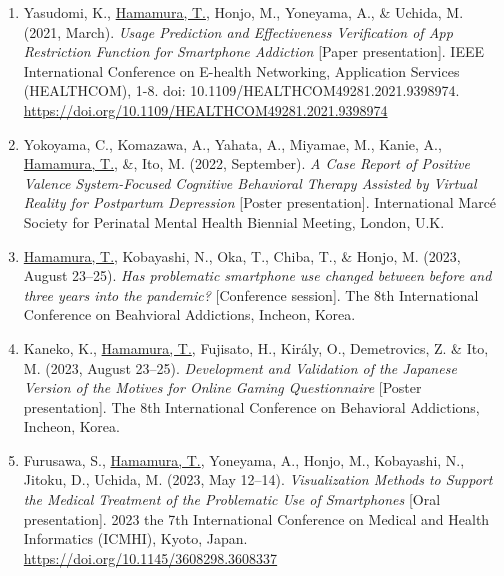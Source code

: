 \documentclass[11pt,a4paper]{article}
\begin{document}
\begin{enumerate}
	\item Yasudomi, K., \underline{Hamamura, T.}, Honjo, M., Yoneyama, A., \& Uchida, M. (2021, March). \textit{Usage Prediction and Effectiveness Verification of App Restriction Function for Smartphone Addiction} [Paper presentation]. IEEE International Conference on E-health Networking, Application Services (HEALTHCOM), 1-8. doi: 10.1109/HEALTHCOM49281.2021.9398974.  \url{https://doi.org/10.1109/HEALTHCOM49281.2021.9398974}
	\item Yokoyama, C., Komazawa, A., Yahata, A., Miyamae, M., Kanie, A., \underline{Hamamura, T.}, \&, Ito, M. (2022, September). \textit{A Case Report of Positive Valence System-Focused Cognitive Behavioral Therapy Assisted by Virtual Reality for Postpartum Depression} [Poster presentation]. International Marc\'e Society for Perinatal Mental Health Biennial Meeting, London, U.K.
	\item \underline{Hamamura, T.}, Kobayashi, N., Oka, T., Chiba, T., \& Honjo, M. (2023, August 23--25). \textit{Has problematic smartphone use changed between before and three years into the pandemic?} [Conference session]. The 8th International Conference on Beahvioral Addictions, Incheon, Korea.
	\item Kaneko, K., \underline{Hamamura, T.}, Fujisato, H., Király, O., Demetrovics, Z. \& Ito, M. (2023, August 23--25). \textit{Development and Validation of the Japanese Version of the Motives for Online Gaming Questionnaire} [Poster presentation]. The 8th International Conference on Behavioral Addictions, Incheon, Korea.
	\item Furusawa, S., \underline{Hamamura, T.}, Yoneyama, A., Honjo, M., Kobayashi, N., Jitoku, D., Uchida, M. (2023, May 12--14). \textit{Visualization Methods to Support the Medical Treatment of the Problematic Use of Smartphones} [Oral presentation]. 2023 the 7th International Conference on Medical and Health Informatics (ICMHI), Kyoto, Japan.  \url{https://doi.org/10.1145/3608298.3608337}
\end{enumerate}
\end{document}
